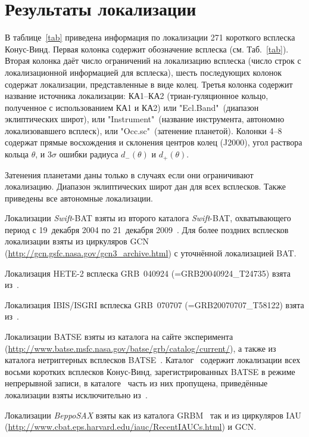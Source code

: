 \section{Результаты локализации}
В таблице~\ref{tab} приведена информация по локализации 271 короткого всплеска Конус-Винд. 
Первая колонка содержит обозначение всплеска (см. Таб.~\ref{tab}). Вторая колонка даёт 
число ограничений на локализацию всплеска (число строк с локализационной информацией 
для всплеска), шесть последующих колонок содержат локализации, представленные в 
виде колец. Третья колонка содержит название источника локализации: 
КА1–КА2 (триан-гуляционное кольцо, полученное с использованием КА1 и КА2) или 
"Ecl.Band"\ (диапазон эклиптических широт), или "Instrument"\ (название инструмента, 
автономно локализовавшего всплеск), или "Occ.sc"\ (затенение планетой). 
Колонки 4--8 содержат прямые восхождения и склонения центров колец (J2000), 
угол раствора кольца $\theta$, и $3\sigma$ ошибки радиуса $d_{-}(\theta)$ и $d_{+}(\theta)$.

Затенения планетами даны только в случаях если они ограничивают локализацию. 
Диапазон эклиптических широт дан для всех всплесков. Также приведены все автономные 
локализации.

Локализации \textit{Swift}-BAT взяты из второго каталога \textit{Swift}-BAT, 
охватывающего период с 19~декабря 2004 по 21~декабря 2009~\citep{Sakamoto_2011ApJS}. 
Для более поздних всплесков локализации взяты из циркуляров GCN 
(\url{http://gcn.gsfc.nasa.gov/gcn3_archive.html}) с уточнённой локализацией BAT.

Локализация HETE-2 всплеска GRB~040924 (=GRB20040924\_T24735) взята из~\citep{Arimoto_2006GCN}.

Локализация IBIS/ISGRI всплеска GRB~070707 (=GRB20070707\_T58122) взята из~\citep{Gotz_2007GCN}.

Локализации BATSE взяты из каталога на сайте эксперимента 
(\url{http://www.batse.msfc.nasa.gov/batse/grb/catalog/current/}), а также из каталога 
нетриггерных всплесков BATSE~\citep{Kommers_2000ApJ, Stern_2001ApJ}. Каталог~\citep{Stern_2001ApJ} 
содержит локализации всех восьми коротких всплесков Конус-Винд, зарегистрированных BATSE 
в режиме непрерывной записи, в каталоге~\citep{Kommers_2000ApJ} часть из них пропущена, 
приведённые локализации взяты исключительно из~\citep{Stern_2001ApJ}.

Локализации \textit{BeppoSAX} взяты как из каталога GRBM~\citep{Frontera_2009ApJS} 
так и из циркуляров IAU (\url{http://www.cbat.eps.harvard.edu/iauc/RecentIAUCs.html}) 
и GCN. 

